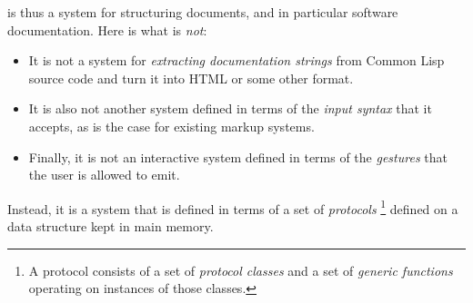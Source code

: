\sysname{} is thus a system for structuring documents, and in
particular software documentation.  Here is what \sysname{} is
\emph{not}:

\begin{itemize}
\item It is not a system for \emph{extracting documentation strings}
  from Common Lisp source code and turn it into HTML or some other
  format.
\item It is also not another system defined in terms of the
  \emph{input syntax} that it accepts, as is the case for existing
  markup systems.
\item Finally, it is not an interactive system defined in terms of the
  \emph{gestures} that the user is allowed to emit.
\end{itemize}

Instead, it is a system that is defined in terms of a set of \clos{}
\emph{protocols}%
\footnote{A \clos{} protocol consists of a set of \emph{protocol
    classes} and a set of \emph{generic functions} operating on
  instances of those classes.}
defined on a data structure kept in main memory.
